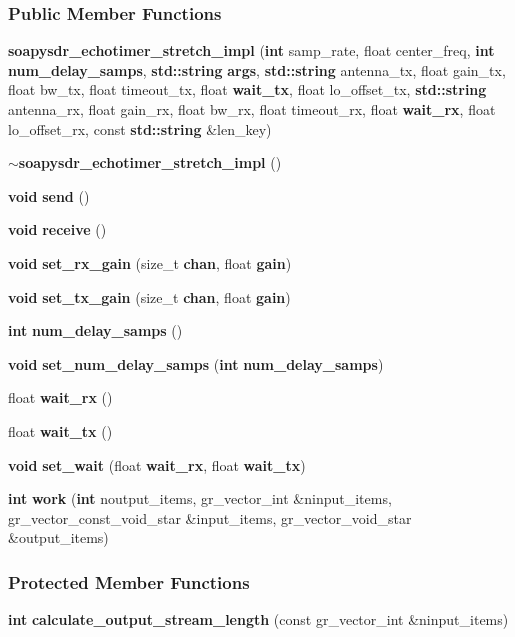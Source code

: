 \subsubsection*{Public Member Functions}
\begin{DoxyCompactItemize}
\item 
{\bf soapysdr\+\_\+echotimer\+\_\+stretch\+\_\+impl} ({\bf int} samp\+\_\+rate, float center\+\_\+freq, {\bf int} {\bf num\+\_\+delay\+\_\+samps}, {\bf std\+::string} {\bf args}, {\bf std\+::string} antenna\+\_\+tx, float gain\+\_\+tx, float bw\+\_\+tx, float timeout\+\_\+tx, float {\bf wait\+\_\+tx}, float lo\+\_\+offset\+\_\+tx, {\bf std\+::string} antenna\+\_\+rx, float gain\+\_\+rx, float bw\+\_\+rx, float timeout\+\_\+rx, float {\bf wait\+\_\+rx}, float lo\+\_\+offset\+\_\+rx, const {\bf std\+::string} \&len\+\_\+key)
\item 
{\bf $\sim$soapysdr\+\_\+echotimer\+\_\+stretch\+\_\+impl} ()
\item 
{\bf void} {\bf send} ()
\item 
{\bf void} {\bf receive} ()
\item 
{\bf void} {\bf set\+\_\+rx\+\_\+gain} (size\+\_\+t {\bf chan}, float {\bf gain})
\item 
{\bf void} {\bf set\+\_\+tx\+\_\+gain} (size\+\_\+t {\bf chan}, float {\bf gain})
\item 
{\bf int} {\bf num\+\_\+delay\+\_\+samps} ()
\item 
{\bf void} {\bf set\+\_\+num\+\_\+delay\+\_\+samps} ({\bf int} {\bf num\+\_\+delay\+\_\+samps})
\item 
float {\bf wait\+\_\+rx} ()
\item 
float {\bf wait\+\_\+tx} ()
\item 
{\bf void} {\bf set\+\_\+wait} (float {\bf wait\+\_\+rx}, float {\bf wait\+\_\+tx})
\item 
{\bf int} {\bf work} ({\bf int} noutput\+\_\+items, gr\+\_\+vector\+\_\+int \&ninput\+\_\+items, gr\+\_\+vector\+\_\+const\+\_\+void\+\_\+star \&input\+\_\+items, gr\+\_\+vector\+\_\+void\+\_\+star \&output\+\_\+items)
\end{DoxyCompactItemize}
\subsubsection*{Protected Member Functions}
\begin{DoxyCompactItemize}
\item 
{\bf int} {\bf calculate\+\_\+output\+\_\+stream\+\_\+length} (const gr\+\_\+vector\+\_\+int \&ninput\+\_\+items)
\end{DoxyCompactItemize}
